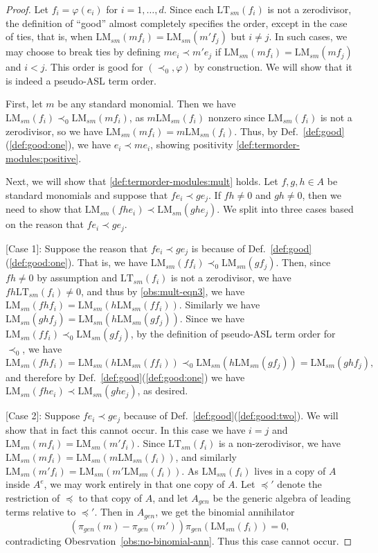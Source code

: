 \documentclass[11pt,reqno]{amsart}
\newcommand{\lmsm}{\text{LM}_{sm}}
\newcommand{\ltsm}{\text{LT}_{sm}}
\theoremstyle{definition}
\numberwithin{equation}{section}
\begin{document}
\begin{proof}
Let $f_i = \varphi(e_i)$ for $i=1,\dotsc,d$. Since each $\ltsm(f_i)$ is not a zerodivisor, 
the definition of ``good'' almost completely specifies the order, except in the case of ties, that is, when $\lmsm(m f_i) = \lmsm(m' f_j)$ but $i \neq j$. 
In such cases, we may choose to break ties by defining $me_i \prec m'e_j$ if $\lmsm(m f_i) = \lmsm(m f_j)$ and $i < j$. This order is good for $(\prec_0, \varphi)$ by construction. We will show that it is indeed a pseudo-ASL term order. 

First, let $m$ be any standard monomial. Then we have $\lmsm(f_i) \prec_0 \lmsm(m f_i)$, as $m\lmsm(f_i)$ nonzero since $\lmsm(f_i)$ is not a zerodivisor, so we have $\lmsm(m f_i) = m \lmsm(f_i)$. Thus, by Def.~\ref{def:good}(\ref{def:good:one}), we have $e_i \prec m e_i$, showing positivity \ref{def:termorder-modules:positive}.

Next, we will show that \ref{def:termorder-modules:mult} holds. Let $f,g,h \in A$ be standard monomials and suppose that $f e_i \prec g e_j$. If $fh \neq 0$ and $gh \neq 0$, then we need to show that $\lmsm(fh e_i) \prec \lmsm(gh e_j)$. We split into three cases based on the reason that $f e_i \prec g e_j$. 

[Case 1]: Suppose the reason that $f e_i \prec g e_j$ is because of Def.~\ref{def:good}(\ref{def:good:one}). That is, we have $\lmsm(f f_i) \prec_0 \lmsm(g f_j)$. Then, since $fh \neq 0$ by assumption and $\ltsm(f_i)$ is not a zerodivisor, we have $fh\ltsm(f_i) \neq 0$, and thus by \eqref{obs:mult-eqn3}, we have $\lmsm(f h f_i) = \lmsm(h \lmsm(ff_i))$. Similarly we have $\lmsm(g h f_j) = \lmsm( h \lmsm(g f_j))$. Since we have $\lmsm(ff_i) \prec_0 \lmsm(gf_j)$, by the definition of pseudo-ASL term order for $\prec_0$, we have 
\[
\lmsm(fhf_i) = \lmsm(h \lmsm(ff_i)) \prec_0 \lmsm(h \lmsm(g f_j)) = \lmsm(g h f_j),
\]
and therefore by Def.~\ref{def:good}(\ref{def:good:one}) we have $\lmsm(fhe_i) \prec \lmsm(gh e_j)$, as desired.

[Case 2]: Suppose $f e_i \prec g e_j$ because of Def.~\ref{def:good}(\ref{def:good:two}). We will show that in fact this cannot occur. In this case we have $i=j$ and $\lmsm(m f_i) = \lmsm(m' f_i)$. Since $\ltsm(f_i)$ is a non-zerodivisor, we have $\lmsm(m f_i) = \lmsm(m \lmsm(f_i))$, and similarly $\lmsm(m' f_i) = \lmsm(m' \lmsm(f_i))$. As $\lmsm(f_i)$ lives in a copy of $A$ inside $A^e$, we may work entirely in that one copy of $A$. Let $\preceq'$ denote the restriction of $\preceq$ to that copy of $A$, and let $A_{gen}$ be the generic algebra of leading terms relative to $\preceq'$. Then in $A_{gen}$, we get the binomial annihilator 
\[
(\pi_{gen}(m) - \pi_{gen}(m')) \pi_{gen}(\lmsm(f_i)) = 0,
\]
contradicting Obesrvation~\ref{obs:no-binomial-ann}. Thus this case cannot occur.


\end{proof}
\end{document}
